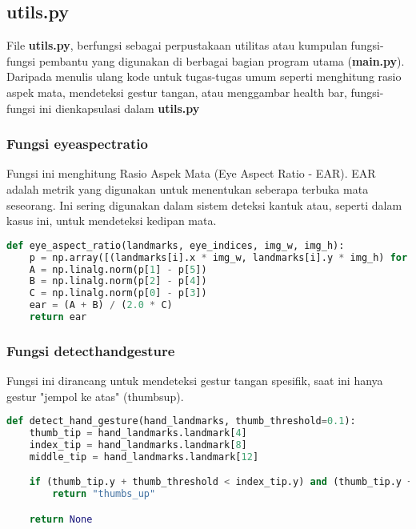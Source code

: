 \documentclass[11pt,a4paper]{article}
\begin{document}
\subsection{utils.py}
 File \textbf{utils.py}, berfungsi sebagai perpustakaan utilitas atau kumpulan fungsi-fungsi pembantu yang digunakan di berbagai bagian program utama (\textbf{main.py}). Daripada menulis ulang kode untuk tugas-tugas umum seperti menghitung rasio aspek mata, mendeteksi gestur tangan, atau menggambar health bar, fungsi-fungsi ini dienkapsulasi dalam \textbf{utils.py}

\subsubsection{Fungsi eye\textunderscore aspect\textunderscore ratio}
Fungsi ini menghitung Rasio Aspek Mata (Eye Aspect Ratio - EAR). EAR adalah metrik yang digunakan untuk menentukan seberapa terbuka mata seseorang. Ini sering digunakan dalam sistem deteksi kantuk atau, seperti dalam kasus ini, untuk mendeteksi kedipan mata.
\begin{lstlisting}[language=Python, caption=eye\textunderscore aspect\textunderscore ratio]
def eye_aspect_ratio(landmarks, eye_indices, img_w, img_h):
    p = np.array([(landmarks[i].x * img_w, landmarks[i].y * img_h) for i in eye_indices])
    A = np.linalg.norm(p[1] - p[5])
    B = np.linalg.norm(p[2] - p[4])
    C = np.linalg.norm(p[0] - p[3])
    ear = (A + B) / (2.0 * C)
    return ear
\end{lstlisting}

\subsubsection{Fungsi detect\textunderscore hand\textunderscore gesture}
Fungsi ini dirancang untuk mendeteksi gestur tangan spesifik, saat ini hanya gestur "jempol ke atas" (thumbs\textunderscore up).

\begin{lstlisting}[language=Python, caption=detect\textunderscore hand\textunderscore gesture]
def detect_hand_gesture(hand_landmarks, thumb_threshold=0.1):
    thumb_tip = hand_landmarks.landmark[4]
    index_tip = hand_landmarks.landmark[8]
    middle_tip = hand_landmarks.landmark[12]

    if (thumb_tip.y + thumb_threshold < index_tip.y) and (thumb_tip.y + thumb_threshold < middle_tip.y):
        return "thumbs_up"

    return None
\end{lstlisting}
\end{document}
